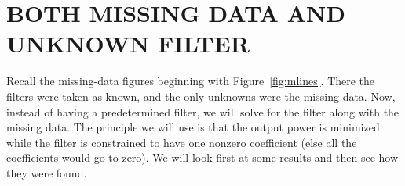 %





\section{BOTH MISSING DATA AND UNKNOWN FILTER}
Recall the missing-data figures beginning with Figure~\ref{fig:mlines}.
There the filters were taken as known,
and the only unknowns were the missing data.
Now, instead of having a predetermined filter,
we will solve for the filter along with the missing data.
The principle we will use is that the output power is minimized
while the filter is constrained to have one nonzero coefficient
(else all the coefficients would go to zero).
We will look first at some results and then see how they were found.

